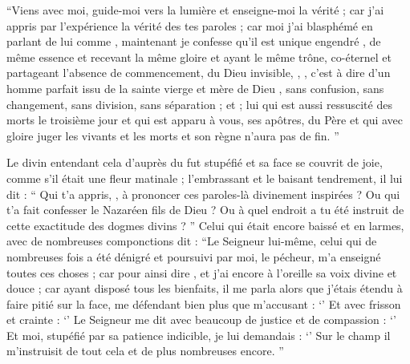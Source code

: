 \enquote{Viens avec moi, guide-moi vers la lumière et enseigne-moi la vérité ; car j'ai appris par l'expérience la vérité des tes paroles ; car moi j'ai blasphémé en parlant de lui comme , maintenant je confesse qu'il est  unique engendré , de même essence et recevant la même gloire et ayant le même trône,
co-éternel et partageant l'absence de commencement,  du Dieu invisible,
, , c'est à dire d'un homme parfait issu de la sainte vierge et mère de Dieu ,
sans confusion, sans changement, sans division, sans séparation ;
et  ; lui qui est aussi ressuscité des morts le troisième jour et qui est apparu à vous, ses apôtres, 
 du Père et qui  %
avec gloire juger les vivants et les morts  et son règne n'aura pas de fin.
}

Le divin  entendant cela  d'auprès du  fut stupéfié et sa face se couvrit de joie, comme s’il était une fleur matinale ;
l'embrassant et le baisant tendrement, il lui dit : \enquote{
Qui t'a appris, , à prononcer ces paroles-là divinement inspirées ?
Ou qui t'a fait confesser  le Nazaréen fils de Dieu ? 
Ou à quel endroit a tu été instruit de cette exactitude des dogmes divins ?
} 
Celui qui était encore baissé et en larmes, avec de nombreuses componctions dit : %
\enquote{Le Seigneur  lui-même, celui qui de nombreuses fois a été dénigré et poursuivi par moi, le pécheur, m'a enseigné toutes ces choses ;
car pour ainsi dire , et j'ai encore à l'oreille sa voix divine et douce ;
car ayant disposé tous les bienfaits, il me parla alors que j'étais étendu à faire pitié sur la face, me défendant bien plus que m'accusant : 
\enquote{}
Et  avec frisson et crainte : 
\enquote{}
Le Seigneur me dit avec beaucoup de justice et de compassion :
\enquote{}
Et moi, stupéfié par sa patience indicible, je lui demandais :
\enquote{}
Sur le champ il m'instruisit de tout cela et de plus nombreuses encore. 	%
}

